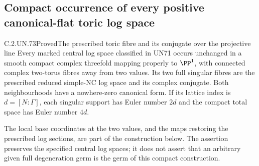 \subsection{Compact occurrence of every positive canonical-flat toric log space}

\begin{statement}{C.2.UN.73}{Proved}{The prescribed toric fibre and its conjugate over the projective line}
Every marked central log space classified in UN71 occurs
unchanged in a smooth compact complex threefold mapping
properly to $\PP^1$, with connected complex two-torus
fibres away from two values. Its two full singular fibres
are the prescribed reduced simple-NC log space and its
complex conjugate. Both neighbourhoods have a nowhere-zero
canonical form. If its lattice index is $d=[N:\Gamma]$,
each singular support has Euler number $2d$ and the
compact total space has Euler number $4d$.

The local base coordinates at the two values, and the
maps restoring the prescribed log sections, are part
of the construction below. The assertion preserves
the specified central log spaces; it does not assert
that an arbitrary given full degeneration germ is
the germ of this compact construction.
\end{statement}

